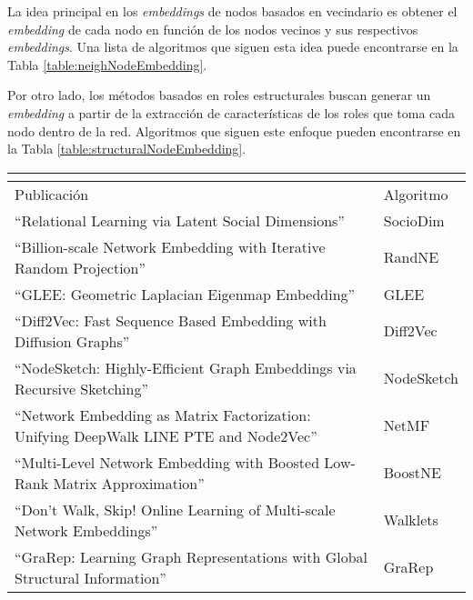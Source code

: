La idea principal en los \textit{embeddings} de nodos basados en vecindario es obtener el \textit{embedding} de cada nodo en función de los nodos vecinos y sus respectivos \textit{embeddings}. Una lista de algoritmos que siguen esta idea puede encontrarse en la Tabla \ref{table:neighNodeEmbedding}.

Por otro lado, los métodos basados en roles estructurales buscan generar un \textit{embedding} a partir de la extracción de características de los roles que toma cada nodo dentro de la red. Algoritmos que siguen este enfoque pueden encontrarse en la Tabla \ref{table:structuralNodeEmbedding}. 

\begin{longtable}
    \centering 
\label{table:neighNodeEmbedding}
    \begin{tabular}{ |p{}|p{}|  }
    \hline
    \multicolumn{2}{|c|}{ \texit{Embeddings de nodos basados en el vecindario} } \\
    \hline
    Publicación & Algoritmo  \\
    \hline
    “Relational Learning via Latent Social Dimensions” \cite{tang_relational_2009} & SocioDim \\
    \hline
    “Billion-scale Network Embedding with Iterative Random Projection” \cite{zhang_billion-scale_2018} & RandNE \\
    \hline
    “GLEE: Geometric Laplacian Eigenmap Embedding” \cite{torres_glee_2020} & GLEE \\
    \hline
    “Diff2Vec: Fast Sequence Based Embedding with Diffusion Graphs” \cite{cornelius_fast_2018} & Diff2Vec \\
    \hline
    “NodeSketch: Highly-Efficient Graph Embeddings via Recursive Sketching” \cite{yang_nodesketch_2019} & NodeSketch \\
    \hline
    “Network Embedding as Matrix Factorization: Unifying DeepWalk LINE PTE and Node2Vec” \cite{qiu_network_2018} & NetMF   \\
    \hline
    “Multi-Level Network Embedding with Boosted Low-Rank Matrix Approximation” \cite{li_multi-level_2019} & BoostNE  \\
    \hline
    “Don’t Walk, Skip! Online Learning of Multi-scale Network Embeddings” \cite{perozzi_dont_2017} & Walklets  \\
    \hline
    “GraRep: Learning Graph Representations with Global Structural Information” \cite{cao_grarep_2015} & GraRep \\

\end{tabular}
\end{longtable}
